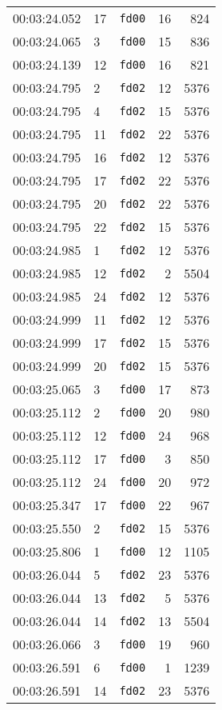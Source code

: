 \documentclass{article}
\begin{document}
\begin{longtable}{lllrr}
00:03:24.052 & 17 & \texttt{fd00} & 16 & 824 \\
00:03:24.065 & 3 & \texttt{fd00} & 15 & 836 \\
00:03:24.139 & 12 & \texttt{fd00} & 16 & 821 \\
00:03:24.795 & 2 & \texttt{fd02} & 12 & 5376 \\
00:03:24.795 & 4 & \texttt{fd02} & 15 & 5376 \\
00:03:24.795 & 11 & \texttt{fd02} & 22 & 5376 \\
00:03:24.795 & 16 & \texttt{fd02} & 12 & 5376 \\
00:03:24.795 & 17 & \texttt{fd02} & 22 & 5376 \\
00:03:24.795 & 20 & \texttt{fd02} & 22 & 5376 \\
00:03:24.795 & 22 & \texttt{fd02} & 15 & 5376 \\
00:03:24.985 & 1 & \texttt{fd02} & 12 & 5376 \\
00:03:24.985 & 12 & \texttt{fd02} & 2 & 5504 \\
00:03:24.985 & 24 & \texttt{fd02} & 12 & 5376 \\
00:03:24.999 & 11 & \texttt{fd02} & 12 & 5376 \\
00:03:24.999 & 17 & \texttt{fd02} & 15 & 5376 \\
00:03:24.999 & 20 & \texttt{fd02} & 15 & 5376 \\
00:03:25.065 & 3 & \texttt{fd00} & 17 & 873 \\
00:03:25.112 & 2 & \texttt{fd00} & 20 & 980 \\
00:03:25.112 & 12 & \texttt{fd00} & 24 & 968 \\
00:03:25.112 & 17 & \texttt{fd00} & 3 & 850 \\
00:03:25.112 & 24 & \texttt{fd00} & 20 & 972 \\
00:03:25.347 & 17 & \texttt{fd00} & 22 & 967 \\
00:03:25.550 & 2 & \texttt{fd02} & 15 & 5376 \\
00:03:25.806 & 1 & \texttt{fd00} & 12 & 1105 \\
00:03:26.044 & 5 & \texttt{fd02} & 23 & 5376 \\
00:03:26.044 & 13 & \texttt{fd02} & 5 & 5376 \\
00:03:26.044 & 14 & \texttt{fd02} & 13 & 5504 \\
00:03:26.066 & 3 & \texttt{fd00} & 19 & 960 \\
00:03:26.591 & 6 & \texttt{fd00} & 1 & 1239 \\
00:03:26.591 & 14 & \texttt{fd02} & 23 & 5376 \\

\end{longtable}
\end{document}
